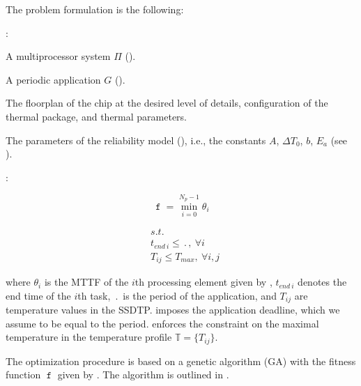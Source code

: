 The problem formulation is the following:

:
\begin{ilist}
  \item A multiprocessor system $\Pi$ ().
  \item A periodic application $G$ ().
  \item The floorplan of the chip at the desired level of details, configuration of the thermal package, and thermal parameters.
  \item The parameters of the reliability model (), i.e., the constants $A$, $\Delta T_0$, $b$, $E_a$ (see ).
\end{ilist}

:\vspace{-5pt}

\begin{minipage}{0.35\linewidth}
  \begin{equation} \label{eq:fitness-function}
    \mttf = \min_{i = 0}^{N_p - 1} \theta_i
  \end{equation}
\end{minipage}
\begin{minipage}{0.6\linewidth}
  \begin{align}
    & s.t. \nonumber \\
    & t_{end \: i} \leq \period, \: \forall i \label{eq:deadline} \\
    & T_{ij} \leq T_{max}, \: \forall i, j \label{eq:t-max}
  \end{align}
\end{minipage}\vspace{5pt}
where $\theta_i$ is the MTTF of the $i$th processing element given by , $t_{end \: i}$ denotes the end time of the $i$th task, $\period$ is the period of the application, and $T_{ij}$ are temperature values in the SSDTP.  imposes the application deadline, which we assume to be equal to the period.  enforces the constraint on the maximal temperature in the temperature profile $\mathbb{T} = \{ T_{ij} \}$.

The optimization procedure is based on a genetic algorithm (GA) \cite{schmitz2004} with the fitness function $\mttf$ given by . The algorithm is outlined in .
